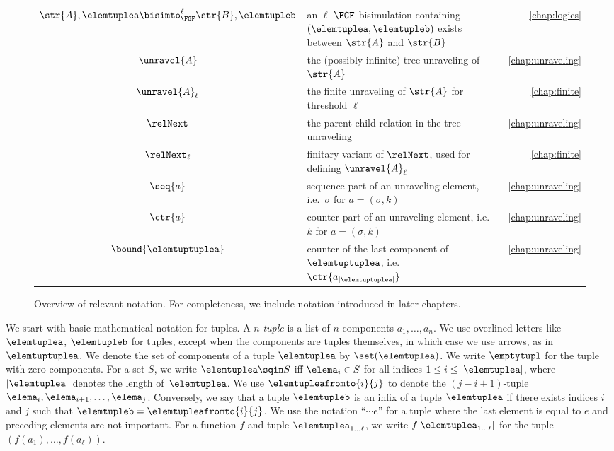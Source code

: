 \begin{figure}
\begin{tabularx}{\textwidth}{c X r}
    $\str{A}, \elemtuplea \bisimto_{\FGF}^{\ell} \str{B}, \elemtupleb$ & an $\ell$-$\FGF$-bisimulation containing $(\elemtuplea, \elemtupleb)$ exists between $\str{A}$ and $\str{B}$ & \cref{chap:logics} \\
    $\unravel{A}$ & the (possibly infinite) tree unraveling of $\str{A}$ & \cref{chap:unraveling} \\
    $\unravel{A}_{\ell}$ & the finite unraveling of $\str{A}$ for threshold $\ell$ & \cref{chap:finite} \\
    $\relNext$ & the parent-child relation in the tree unraveling & \cref{chap:unraveling} \\
    $\relNext_{\ell}$ & finitary variant of $\relNext$, used for defining $\unravel{A}_{\ell}$ & \cref{chap:finite} \\
    $\seq{a}$ & sequence part of an unraveling element, i.e.\ $\sigma$ for $a = (\sigma, k)$ & \cref{chap:unraveling} \\
    $\ctr{a}$ & counter part of an unraveling element, i.e.\ $k$ for $a = (\sigma, k)$ & \cref{chap:unraveling} \\
    $\bound{\elemtuptuplea}$ & counter of the last component of $\elemtuptuplea$, i.e.\ $\ctr{a_{|\elemtuptuplea|}}$ & \cref{chap:unraveling} \\
  \end{tabularx}
  \egroup
  \caption{Overview of relevant notation. For completeness, we include notation introduced in later chapters.}%
  \label{fig:notation-quickref}
\end{figure}

We start with basic mathematical notation for tuples.
A $n$-\emph{tuple} is a list of $n$ components $a_{1}, \ldots{}, a_{n}$.
We use overlined letters like $\elemtuplea$, $\elemtupleb$ for tuples, except when the components are tuples themselves, in which case we use arrows, as in $\elemtuptuplea$.
We denote the set of components of a tuple $\elemtuplea$ by $\set(\elemtuplea)$.
We write $\emptytupl$ for the tuple with zero components.
For a set $S$, we write $\elemtuplea \sqin S$ iff $\elema_i \in S$ for all indices $1 \leq i \leq |\elemtuplea|$, where $|\elemtuplea|$ denotes the length of~$\elemtuplea$.
We use $\elemtupleafromto{i}{j}$ to denote the $(j{-}i{+}1)$-tuple $\elema_i, \elema_{i+1}, \ldots, \elema_j$.
Conversely, we say that a tuple $\elemtupleb$ is an infix of a tuple $\elemtuplea$ if there exists indices $i$ and $j$ such that $\elemtupleb = \elemtupleafromto{i}{j}$.
We use the notation ``$\cdots e$'' for a tuple where the last element is equal to $e$ and preceding elements are not important.
For a function $f$ and tuple $\elemtuplea_{1\ldots\ell}$, we write $f[\elemtuplea_{1\ldots\ell}]$ for the tuple $(f(a_{1}), \ldots, f(a_{\ell}))$.

